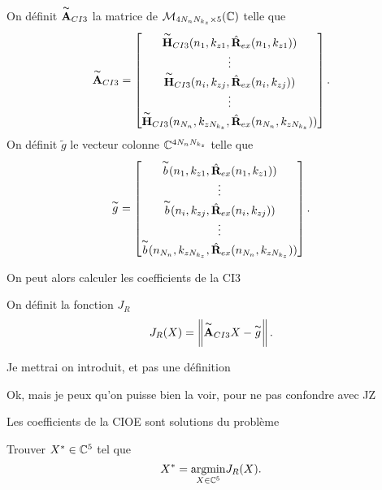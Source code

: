     \begin{defn}
      On définit \(\overset{\thicksim}{\mathbf{A}}_{CI3}\) la matrice de \(\mathcal{M}_{4N_{n}N_{k_z}\times5}(\mathbb C)\) telle que
      \begin{equation*}
        \overset{\thicksim}{\mathbf{A}}_{CI3} = 
        \begin{bmatrix}
          \overset{\thicksim}{\mathbf{H}}_{CI3}(n_1,k_{z1},\hat{\mathbf{R}}_{ex}(n_1,k_{z1}))
          \\
          \vdots
          \\
          \overset{\thicksim}{\mathbf{H}}_{CI3}(n_i,k_{zj},\hat{\mathbf{R}}_{ex}(n_i,k_{zj}))
          \\
          \vdots
          \\
          \overset{\thicksim}{\mathbf{H}}_{CI3}(n_{N_n},k_{zN_{k_z}},\hat{\mathbf{R}}_{ex}(n_{N_n},k_{zN_{k_z}}))
        \end{bmatrix}.
      \end{equation*}
      On définit \(\tilde{g}\) le vecteur colonne \(\mathbb C^{4N_{n}N_{k_z}}\) telle que
      \begin{equation*}
        \overset{\thicksim}{g} = 
        \begin{bmatrix}
          \overset{\thicksim}{b}(n_1,k_{z1},\hat{\mathbf{R}}_{ex}(n_1,k_{z1}))
          \\
          \vdots
          \\
          \overset{\thicksim}{b}(n_i,k_{zj},\hat{\mathbf{R}}_{ex}(n_i,k_{zj}))
          \\
          \vdots
          \\
          \overset{\thicksim}{b}(n_{N_n},k_{zN_{k_z}},\hat{\mathbf{R}}_{ex}(n_{N_n},k_{zN_{k_z}}))
        \end{bmatrix}.
      \end{equation*}
    \end{defn}

    On peut alors calculer les coefficients de la CI3

    \begin{defn}
      On définit la fonction \(J_R\)
      \begin{equation*}
        J_R(X) = \left\lVert\overset{\thicksim}{\mathbf{A}}_{CI3}X - \overset{\thicksim}{g}\right\rVert.
      \end{equation*}
    \end{defn}
    \begin{REM}
      Je mettrai on introduit, et pas une définition
    \end{REM}
    \begin{REP}
      Ok, mais je peux qu'on puisse bien la voir, pour ne pas confondre avec JZ
    \end{REP}
    \begin{thm}

      Les coefficients de la CIOE sont solutions du problème

      Trouver \(X^* \in \mathbb C^5\) tel que
      \begin{equation*}
        X^* = {\underset{X\in \mathbb C^5}{\operatorname{argmin}}} J_R(X).
      \end{equation*}
    \end{thm}

